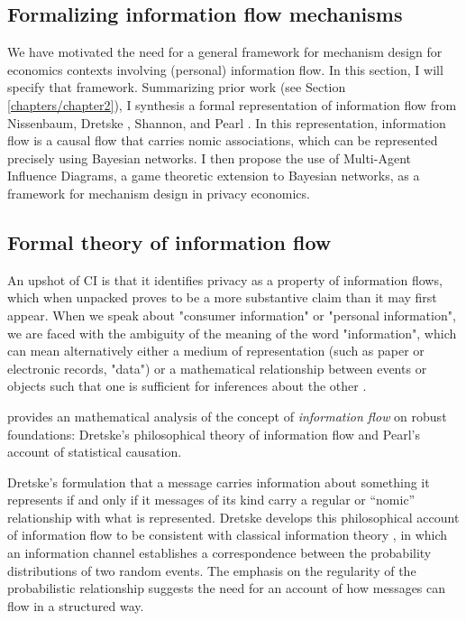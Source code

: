 \documentclass[../thesis.tex]{subfiles}
\begin{document}
\subsection{Formalizing information flow mechanisms}
\label{sec:formalizing}

We have motivated the need for a general framework
for mechanism design for economics contexts involving
(personal) information flow.
In this section, I will specify that framework.
Summarizing prior work (see Section \ref{chapters/chapter2}),
I synthesis a formal representation
of information flow from Nissenbaum,
Dretske \cite{dretske1981knowledge},
Shannon,
and Pearl \cite{pearl1988probabilistic}.
In this representation, information flow is a causal flow
that carries nomic associations, which can be represented
precisely using Bayesian networks.
I then propose the use of Multi-Agent Influence Diagrams,
a game theoretic extension to Bayesian networks, as
a framework for mechanism design in privacy economics.
\cite{koller2003multi}

\subsection{Formal theory of information flow}

An upshot of CI is that it identifies privacy as a 
property of information flows, which when unpacked proves
to be a more substantive claim than it may first appear.
When we speak about "consumer information" or 
"personal information", we are faced with the ambiguity
of the meaning of the word "information", which can mean
alternatively either a medium of representation (such as
paper or electronic records, "data") or a mathematical
relationship between events or objects such that one
is sufficient for inferences about the other
\cite{nunberg1996farewell}.

\cite{benthall2017origin} provides an mathematical
analysis of the concept of \emph{information flow}
on robust foundations: Dretske's philosophical theory
of information flow and Pearl's account of statistical
causation.

Dretske's \cite{dretske1981knowledge} formulation
that a message carries information about something it represents
if and only if it messages of its kind carry a regular or ``nomic''
relationship with what is represented.
Dretske develops this philosophical account of information flow
to be consistent with classical information theory
\cite{shannon1948mathematical}, in which an information channel
establishes a correspondence between the probability distributions
of two random events.
The emphasis on the regularity of the probabilistic relationship
suggests the need for an account of how messages can flow
in a structured way.
\end{document}
